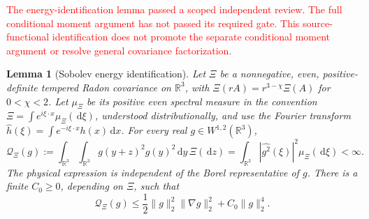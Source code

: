 \documentclass[12pt]{article}
\numberwithin{equation}{section}
\newtheorem{lemma}[theorem]{Lemma}
\theoremstyle{definition}
\newcommand{\R}{\mathbb{R}}
\newcommand{\ud}{\,\mathrm{d}}
\newcommand{\myCmts}[1]{\begin{framed}\noindent\textcolor{red}{#1}\end{framed}}
\begin{document}
\myCmts{The energy-identification lemma passed a scoped independent review.
The full conditional moment argument has not passed its required gate.
This source-functional identification does not promote the separate
conditional moment argument or resolve general covariance factorization.}

\begin{lemma}[Sobolev energy identification]\label{L:physical-spectral-energy}
  Let $\Xi$ be a nonnegative, even, positive-definite tempered Radon
  covariance on $\R^3$, with
  $\Xi(rA)=r^{3-\chi}\Xi(A)$ for $0<\chi<2$.
  Let $\mu_\Xi$ be its positive even spectral measure in the convention
  $\Xi=\int e^{i\xi\cdot x}\mu_\Xi(\ud\xi)$, understood distributionally,
  and use the Fourier transform
  $\widehat h(\xi)=\int e^{-i\xi\cdot x}h(x)\ud x$.
  For every real $g\in W^{1,2}(\R^3)$,
  \begin{equation}\label{E:physical-spectral-energy}
    \mathcal Q_\Xi(g)
    :=\int_{\R^3}\int_{\R^3}g(y+z)^2g(y)^2\ud y\,\Xi(\ud z)
    =\int_{\R^3}|\widehat{g^2}(\xi)|^2\mu_\Xi(\ud\xi)<\infty.
  \end{equation}
  The physical expression is independent of the Borel representative
  of $g$. There is a finite $C_0\ge0$, depending on $\Xi$, such that
  \begin{equation}\label{E:energy-quartic-bound}
    \mathcal Q_\Xi(g)
    \le\frac12\|g\|_2^2\|\nabla g\|_2^2+C_0\|g\|_2^4.
  \end{equation}
\end{lemma}
\end{document}
